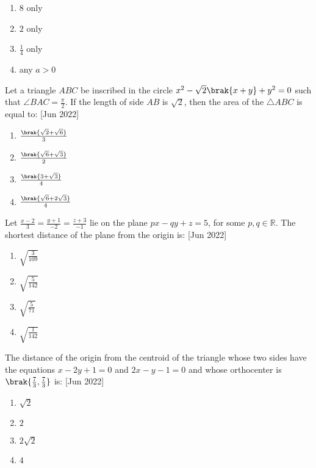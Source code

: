 		\begin{enumerate}
			\item $8$ only\\
			\item $2$ only\\
			\item $\frac{1}{4}$ only\\
			\item any $a>0$\\
		\end{enumerate}
	\item Let a triangle $ABC$ be inscribed in the circle $x^2-\sqrt{2}\brak{x+y}+y^2=0$ such that $\angle BAC=\frac{\pi}{2}$. If the length of side $AB$ is $\sqrt{2}$, then the area of the $\triangle ABC$ is equal to: \hfill{[Jun 2022]}
		\begin{enumerate}
			\item $\frac{\brak{\sqrt{2}+\sqrt{6}}}{3}$\\
			\item $\frac{\brak{\sqrt{6}+\sqrt{3}}}{2}$\\
			\item $\frac{\brak{3+\sqrt{3}}}{4}$\\
			\item $\frac{\brak{\sqrt{6}+2\sqrt{3}}}{4}$\\
		\end{enumerate}
	\item Let $\frac{x-2}{3}=\frac{y+1}{-2}=\frac{z+3}{-1}$ lie on the plane $px-qy+z=5$, for some $p, q\in\mathbb{R}$. The shortest distance of the plane from the origin is: \hfill{[Jun 2022]}
		\begin{enumerate}
			\item $\sqrt{\frac{3}{109}}$\\
			\item $\sqrt{\frac{5}{142}}$\\
			\item $\sqrt{\frac{5}{71}}$\\
			\item $\sqrt{\frac{1}{142}}$\\
		\end{enumerate}
	\item The distance of the origin from the centroid of the triangle whose two sides have the equations $x-2y+1=0$ and $2x-y-1=0$ and whose orthocenter is $\brak{\frac{7}{3},\frac{7}{3}}$ is: \hfill{[Jun 2022]}
		\begin{enumerate}
			\item $\sqrt{2}$\\
			\item $2$\\
			\item $2\sqrt{2}$\\
			\item $4$\\
		\end{enumerate}
